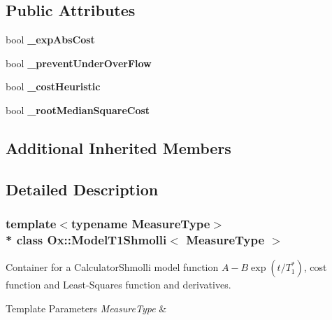 \subsection*{Public Attributes}
\begin{DoxyCompactItemize}
\item 
bool {\bfseries \+\_\+exp\+Abs\+Cost}\hypertarget{class_ox_1_1_model_t1_shmolli_a9ef12784ac237845296da239cd4517f2}{}\label{class_ox_1_1_model_t1_shmolli_a9ef12784ac237845296da239cd4517f2}

\item 
bool {\bfseries \+\_\+prevent\+Under\+Over\+Flow}\hypertarget{class_ox_1_1_model_t1_shmolli_aa7fd686c2f08a4ed27d33b934fcad37f}{}\label{class_ox_1_1_model_t1_shmolli_aa7fd686c2f08a4ed27d33b934fcad37f}

\item 
bool {\bfseries \+\_\+cost\+Heuristic}\hypertarget{class_ox_1_1_model_t1_shmolli_adc598e5bee08606512d2a823536f7b3d}{}\label{class_ox_1_1_model_t1_shmolli_adc598e5bee08606512d2a823536f7b3d}

\item 
bool {\bfseries \+\_\+root\+Median\+Square\+Cost}\hypertarget{class_ox_1_1_model_t1_shmolli_a043784373e50e27f8dfbdd42d82eb290}{}\label{class_ox_1_1_model_t1_shmolli_a043784373e50e27f8dfbdd42d82eb290}

\end{DoxyCompactItemize}
\subsection*{Additional Inherited Members}


\subsection{Detailed Description}
\subsubsection*{template$<$typename Measure\+Type$>$\\*
class Ox\+::\+Model\+T1\+Shmolli$<$ Measure\+Type $>$}

Container for a Calculator\+Shmolli model function $ A-B\exp(t/T_1^*) $, cost function and Least-\/\+Squares function and derivatives. 


\begin{DoxyTemplParams}{Template Parameters}
{\em Measure\+Type} & \\
\hline
\end{DoxyTemplParams}


